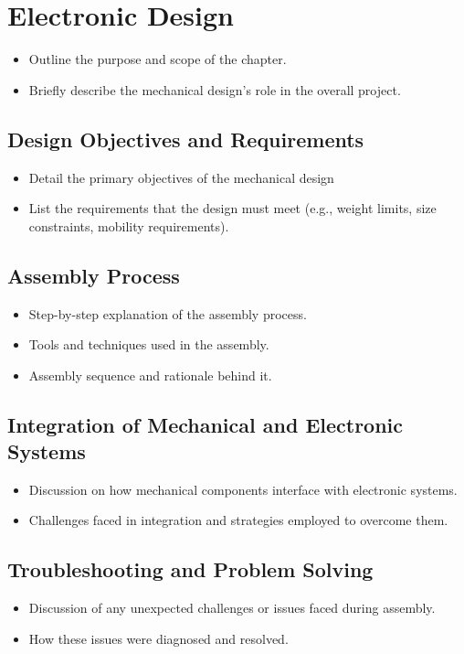 \chapter{Electronic Design}

\graphicspath{{./Figures/Modeling}}



\begin{itemize}
	\item Outline the purpose and scope of the chapter.
	\item Briefly describe the mechanical design's role in the overall project.
\end{itemize}


\section{Design Objectives and Requirements}
\begin{itemize}
	\item Detail the primary objectives of the mechanical design
	\item List the requirements that the design must meet (e.g., weight limits, size constraints, mobility requirements).
\end{itemize}
\section{Assembly Process}
\begin{itemize}
	\item Step-by-step explanation of the assembly process.
	\item Tools and techniques used in the assembly.
	\item Assembly sequence and rationale behind it.
\end{itemize}
\section{Integration of Mechanical and Electronic Systems}
\begin{itemize}
	\item Discussion on how mechanical components interface with electronic systems.
	\item Challenges faced in integration and strategies employed to overcome them.
\end{itemize}
\section{Troubleshooting and Problem Solving}
\begin{itemize}
	\item Discussion of any unexpected challenges or issues faced during assembly.
	\item How these issues were diagnosed and resolved.
\end{itemize}
